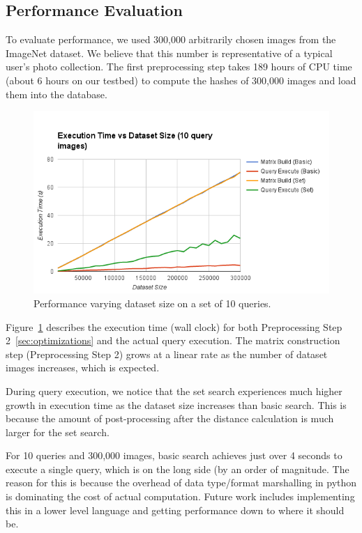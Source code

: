 \subsection{Performance Evaluation}
To evaluate performance, we used 300,000 arbitrarily chosen images from the ImageNet dataset.
We believe that this number is representative of a typical user's photo collection.
The first preprocessing step takes 189 hours of CPU time (about 6 hours on our testbed) to compute the hashes of 300,000 images and load them into the database.

\begin{figure}[t]
    \begin{minipage}{1.0\columnwidth}
        \centering
        \includegraphics[width=0.9\columnwidth]{figs/vary-dataset}
    \end{minipage}
    \caption{Performance varying dataset size on a set of 10 queries.}
    \label{fig:vary-dataset}
\end{figure}
Figure~\ref{fig:vary-dataset} describes the execution time (wall clock) for both Preprocessing Step 2~\ref{sec:optimizations} and the actual query execution.
The matrix construction step (Preprocessing Step 2) grows at a linear rate as the number of dataset images increases, which is expected.

During query execution, we notice that the set search experiences much higher growth in execution time as the dataset size increases than basic search.
This is because the amount of post-processing after the distance calculation is much larger for the set search.

For 10 queries and 300,000 images, basic search achieves just over 4 seconds to execute a single query, which is on the long side (by an order of magnitude.
The reason for this is because the overhead of data type/format marshalling in python is dominating the cost of actual computation. Future work includes
implementing this in a lower level language and getting performance down to where it should be.

